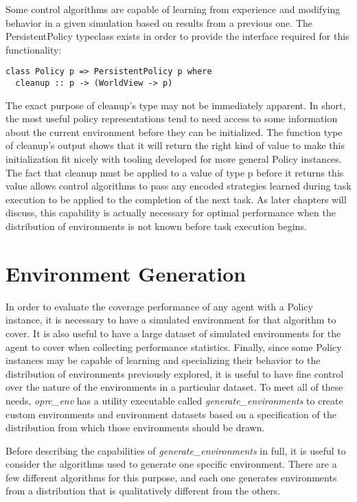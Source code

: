 Some control algorithms are capable of learning from experience and modifying behavior in a given simulation based on results from a previous one. The PersistentPolicy typeclass exists in order to provide the interface required for this functionality:

\begin{verbatim}
class Policy p => PersistentPolicy p where
  cleanup :: p -> (WorldView -> p)
\end{verbatim}

The exact purpose of cleanup's type may not be immediately apparent. In short, the most useful policy representations tend to need access to some information about the current environment before they can be initialized. The function type of cleanup's output shows that it will return the right kind of value to make this initialization fit nicely with tooling developed for more general Policy instances. The fact that cleanup must be applied to a value of type p before it returns this value allows control algorithms to pass any encoded strategies learned during task execution to be applied to the completion of the next task. As later chapters will discuss, this capability is actually necessary for optimal performance when the distribution of environments is not known before task execution begins.

\section{Environment Generation}

In order to evaluate the coverage performance of any agent with a Policy instance, it is necessary to have a simulated environment for that algorithm to cover. It is also useful to have a large dataset of simulated environments for the agent to cover when collecting performance statistics. Finally, since some Policy instances may be capable of learning and specializing their behavior to the distribution of environments previously explored, it is useful to have fine control over the nature of the environments in a particular dataset. To meet all of these needs, \textit{oprc\_env} has a utility executable called \textit{generate\_environments} to create custom environments and environment datasets based on a specification of the distribution from which those environments should be drawn.

Before describing the capabilities of \textit{generate\_environments} in full, it is useful to consider the algorithms used to generate one specific environment. There are a few different algorithms for this purpose, and each one generates environments from a distribution that is qualitatively different from the others.

